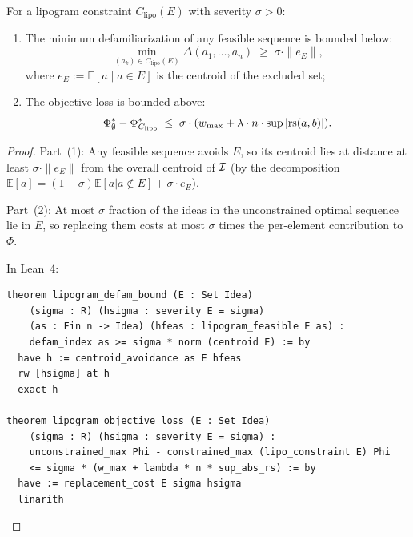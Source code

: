 \begin{theorem}
\label{thm:lipogram-defam}
For a lipogram constraint $C_{\text{lipo}}(E)$ with severity $\sigma > 0$:
\begin{enumerate}
  \item The minimum defamiliarization of any feasible sequence is bounded below:
    \[
      \min_{(a_k) \in C_{\text{lipo}}(E)} \Delta(a_1, \ldots, a_n)
      \;\geq\; \sigma \cdot \|e_E\|,
    \]
    where $e_E := \mathbb{E}[a \mid a \in E]$ is the centroid of the
    excluded set;
  \item The objective loss is bounded above:
    \[
      \Phi^\ast_\emptyset - \Phi^\ast_{C_{\text{lipo}}} \;\leq\;
      \sigma \cdot (w_{\max} + \lambda \cdot n \cdot \sup|\mathrm{rs}(a, b)|).
    \]
\end{enumerate}
\end{theorem}

\begin{proof}
Part~(1): Any feasible sequence avoids $E$, so its centroid lies at distance
at least $\sigma \cdot \|e_E\|$ from the overall centroid of $\mathcal{I}$ (by the
decomposition $\mathbb{E}[a] = (1-\sigma)\mathbb{E}[a|a \notin E] +
\sigma \cdot e_E$).

Part~(2): At most $\sigma$ fraction of the ideas in the unconstrained
optimal sequence lie in $E$, so replacing them costs at most $\sigma$ times
the per-element contribution to $\Phi$.

In Lean~4:
\begin{lstlisting}
theorem lipogram_defam_bound (E : Set Idea)
    (sigma : R) (hsigma : severity E = sigma)
    (as : Fin n -> Idea) (hfeas : lipogram_feasible E as) :
    defam_index as >= sigma * norm (centroid E) := by
  have h := centroid_avoidance as E hfeas
  rw [hsigma] at h
  exact h

theorem lipogram_objective_loss (E : Set Idea)
    (sigma : R) (hsigma : severity E = sigma) :
    unconstrained_max Phi - constrained_max (lipo_constraint E) Phi
    <= sigma * (w_max + lambda * n * sup_abs_rs) := by
  have := replacement_cost E sigma hsigma
  linarith
\end{lstlisting}
\end{proof}

